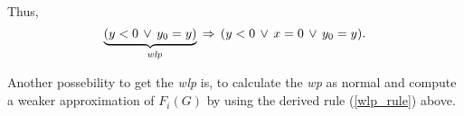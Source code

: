 Thus,%
\begin{equation*}
\underbrace{(y<0\,\vee \,y_{0}=y)}_{\text{\textit{wlp}}}\,\Rightarrow
\,(y<0\,\vee \,x=0\,\vee \,y_{0}=y).
\end{equation*}

Another possebility to get the \textit{wlp} is, to calculate the 
\textit{wp} as normal and compute a weaker approximation of $F_{i}(G)$ by
using the derived rule (\ref{wlp_rule}) above.
